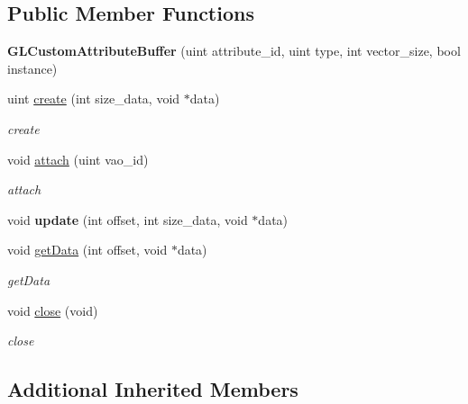 \subsection*{Public Member Functions}
\begin{DoxyCompactItemize}
\item 
\hypertarget{classEngine_1_1GLCustomAttributeBuffer_a63094f27c825fef583f86f154d10199e}{}{\bfseries G\+L\+Custom\+Attribute\+Buffer} (uint attribute\+\_\+id, uint type, int vector\+\_\+size, bool instance)\label{classEngine_1_1GLCustomAttributeBuffer_a63094f27c825fef583f86f154d10199e}

\item 
uint \hyperlink{classEngine_1_1GLCustomAttributeBuffer_a41743693090a4ea7d0021f61d80e83a8}{create} (int size\+\_\+data, void $\ast$data)
\begin{DoxyCompactList}\small\item\em create \end{DoxyCompactList}\item 
void \hyperlink{classEngine_1_1GLCustomAttributeBuffer_a0decec64cba335e28acd81268650c3b3}{attach} (uint vao\+\_\+id)
\begin{DoxyCompactList}\small\item\em attach \end{DoxyCompactList}\item 
\hypertarget{classEngine_1_1GLCustomAttributeBuffer_a1ce190cb90d2b46c4524794b2d21a5ca}{}void {\bfseries update} (int offset, int size\+\_\+data, void $\ast$data)\label{classEngine_1_1GLCustomAttributeBuffer_a1ce190cb90d2b46c4524794b2d21a5ca}

\item 
void \hyperlink{classEngine_1_1GLCustomAttributeBuffer_a828a015ce58e25c6422505f0cadfd799}{get\+Data} (int offset, void $\ast$data)
\begin{DoxyCompactList}\small\item\em get\+Data \end{DoxyCompactList}\item 
void \hyperlink{classEngine_1_1GLCustomAttributeBuffer_a84dd56904b35cd71f6a8866c36063f5d}{close} (void)
\begin{DoxyCompactList}\small\item\em close \end{DoxyCompactList}\end{DoxyCompactItemize}
\subsection*{Additional Inherited Members}


